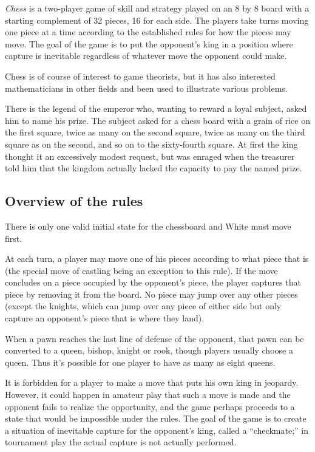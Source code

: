 \documentclass[12pt]{article}
\begin{document}
{\em Chess} is a two-player game of skill and strategy played on an 8 by 8 board with a starting complement of 32 pieces, 16 for each side. The players take turns moving one piece at a time according to the established rules for how the pieces may move. The goal of the game is to put the opponent's king in a position where capture is inevitable regardless of whatever move the opponent could make.

Chess is of course of interest to game theorists, but it has also interested mathematicians in other fields and been used to illustrate various problems.

There is the legend of the emperor who, wanting to reward a loyal subject, asked him to name his prize. The subject asked for a chess board with a grain of rice on the first square, twice as many on the second square, twice as many on the third square as on the second, and so on to the sixty-fourth square. At first the king thought it an excessively modest request, but was enraged when the treasurer told him that the kingdom actually lacked the capacity to pay the named prize.

\subsection{Overview of the rules}

There is only one valid initial state for the chessboard and White must move first.

At each turn, a player may move one of his pieces according to what piece that is (the special move of castling being an exception to this rule). If the move concludes on a piece occupied by the opponent's piece, the player captures that piece by removing it from the board. No piece may jump over any other pieces (except the knights, which can jump over any piece of either side but only capture an opponent's piece that is where they land).

When a pawn reaches the last line of defense of the opponent, that pawn can be converted to a queen, bishop, knight or rook, though players usually choose a queen. Thus it's possible for one player to have as many as eight queens.

It is forbidden for a player to make a move that puts his own king in jeopardy. However, it could happen in amateur play that such a move is made and the opponent fails to realize the opportunity, and the game perhaps proceeds to a state that would be impossible under the rules. The goal of the game is to create a situation of inevitable capture for the opponent's king, called a ``checkmate;'' in tournament play the actual capture is not actually performed.
\end{document}
